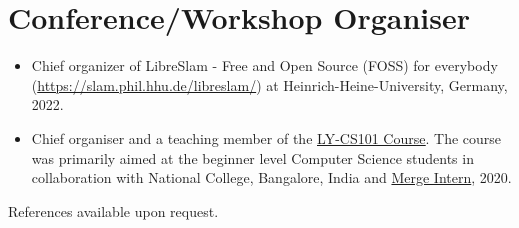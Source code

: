 \documentclass[11pt,a4paper,sans]{moderncv}
\begin{document}
\section{Conference/Workshop Organiser}
\begin{itemize}
    \item Chief organizer of LibreSlam - Free and Open Source (FOSS) for everybody (\url{https://slam.phil.hhu.de/libreslam/}) at Heinrich-Heine-University, Germany, 2022.
    \item Chief organiser and a teaching member of the \underline{{\href{https://youtube.com/playlist?list=PLzgT9LNklpYDFav5-jj4IiRYVP91ufMtf}{LY-CS101 Course}}}. The course was primarily aimed at the beginner level Computer Science students in collaboration with National College, Bangalore, India and \href{https://www.mergeintern.com/}{Merge Intern}, 2020.
\end{itemize}

\vspace{8pt}

References available upon request.

 



\nocite{*}

                    
\end{document}
